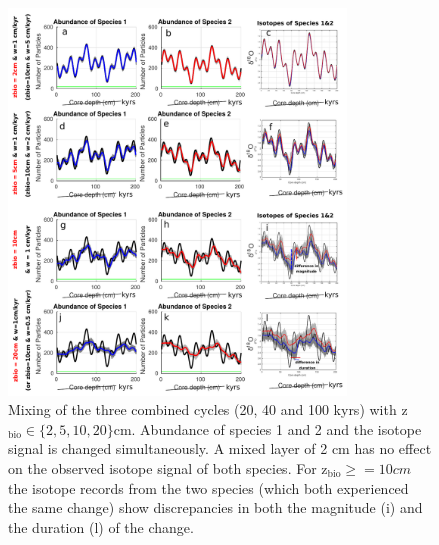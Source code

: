 \documentclass[a4paper,oneside,9pt]{article}
\begin{document}
\begin{figure}[hbp]
\begin{center}
	\includegraphics[width=0.8\textwidth]{../figures/../figures/Allcycles_combined_2+5+10+20cm_background.pdf}
	\caption{Mixing of the three combined cycles (20, 40 and 100 kyrs) with z$_\mathrm{bio} \in \{2,5,10,20 \}$cm. Abundance of species 1 and 2 and the isotope signal is changed simultaneously. 
	A mixed layer of 2 cm has no effect on the observed isotope signal of both species. For z$_\mathrm{bio}\geq=10cm$ the isotope records from the two species (which both experienced the same change) show discrepancies 
	in both the magnitude (i) and the duration (l) of the change.}\label{fig:allcyclescombined}
\end{center}
\end{figure}
\end{document}
